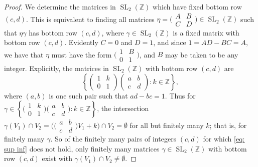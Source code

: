 \documentclass[10pt,leqno,twoside]{article}
\theoremstyle{plain}
\theoremstyle{definition}
\numberwithin{equation}{section}
\numberwithin{lem}{section}
\newcommand{\cbr}[1]{\left\{#1\right\}}
\DeclareMathOperator{\SL}{SL}
\newcommand{\slz}{\SL_2(\mathbb{Z})}
\begin{document}
\begin{proof}
    We determine the matrices in $\slz$ which have fixed bottom row $(c,d)$. This is equivalent to finding all matrices $\eta = \big(\!\begin{smallmatrix}
        A & B \\ C & D
    \end{smallmatrix}\!\big)\in \slz$ such that $\eta\gamma$ has bottom row $(c,d)$, where $\gamma\in \slz$ is a fixed matrix with  bottom row $(c,d)$. Evidently $C=0$ and $D = 1$, and since $1 = AD - BC = A$, we have that $\eta$ must have the form $\big(\!\begin{smallmatrix}
        1 & B \\ 0  & 1
    \end{smallmatrix}\!\big)$, and $B$ may be taken to be any integer. Explicitly, the matrices in $\slz$ with bottom row $(c,d)$ are \[\cbr{\begin{pmatrix}
        1 & k \\ 0 & 1
    \end{pmatrix}\begin{pmatrix}
        a & b \\ c & d
    \end{pmatrix}: k\in \mathbb{Z}},\]
    where $(a,b)$ is one such pair such that $ad-bc = 1$. Thus for $\gamma\in \cbr{\big(\!\begin{smallmatrix}
        1 & k \\ 0 & 1
    \end{smallmatrix}\!\big)\big(\!\begin{smallmatrix}
        a & b \\ c & d
    \end{smallmatrix}\!\big): k\in \mathbb{Z}}$, the intersection $\gamma(V_1)\cap V_2 = \big(\big(\!\begin{smallmatrix}
        a & b \\ c & d
    \end{smallmatrix}\!\big)V_1+ k\big)\cap V_2 =\emptyset$ for all but finitely many $k$; that is, for finitely many $\gamma$. So of the finitely many pairs of integers $(c,d)$ for which \cref{eq: sup inf} does not hold, only finitely many matrices $\gamma\in \slz$ with bottom row $(c,d)$ exist with $\gamma(V_1)\cap V_2\neq \emptyset$.


\end{proof}
\end{document}
